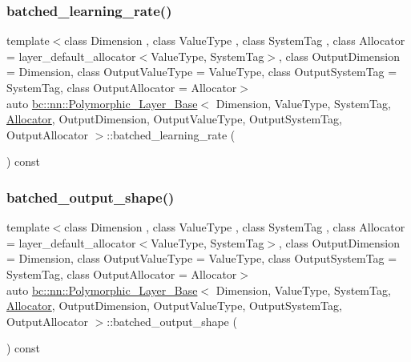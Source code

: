 \subsubsection{\texorpdfstring{batched\+\_\+learning\+\_\+rate()}{batched\_learning\_rate()}\hspace{0.1cm}{\footnotesize\ttfamily [2/2]}}
{\footnotesize\ttfamily template$<$class Dimension , class Value\+Type , class System\+Tag , class Allocator  = layer\+\_\+default\+\_\+allocator$<$\+Value\+Type, System\+Tag$>$, class Output\+Dimension  = Dimension, class Output\+Value\+Type  = Value\+Type, class Output\+System\+Tag  = System\+Tag, class Output\+Allocator  = Allocator$>$ \\
auto \hyperlink{structbc_1_1nn_1_1Polymorphic__Layer__Base}{bc\+::nn\+::\+Polymorphic\+\_\+\+Layer\+\_\+\+Base}$<$ Dimension, Value\+Type, System\+Tag, \hyperlink{classbc_1_1allocators_1_1Allocator}{Allocator}, Output\+Dimension, Output\+Value\+Type, Output\+System\+Tag, Output\+Allocator $>$\+::batched\+\_\+learning\+\_\+rate (\begin{DoxyParamCaption}{ }\end{DoxyParamCaption}) const\hspace{0.3cm}{\ttfamily [inline]}}

\mbox{\label{structbc_1_1nn_1_1Polymorphic__Layer__Base_a93154c06cdfce8282d48a114055d3e2a}} 
\subsubsection{\texorpdfstring{batched\+\_\+output\+\_\+shape()}{batched\_output\_shape()}\hspace{0.1cm}{\footnotesize\ttfamily [1/2]}}
{\footnotesize\ttfamily template$<$class Dimension , class Value\+Type , class System\+Tag , class Allocator  = layer\+\_\+default\+\_\+allocator$<$\+Value\+Type, System\+Tag$>$, class Output\+Dimension  = Dimension, class Output\+Value\+Type  = Value\+Type, class Output\+System\+Tag  = System\+Tag, class Output\+Allocator  = Allocator$>$ \\
auto \hyperlink{structbc_1_1nn_1_1Polymorphic__Layer__Base}{bc\+::nn\+::\+Polymorphic\+\_\+\+Layer\+\_\+\+Base}$<$ Dimension, Value\+Type, System\+Tag, \hyperlink{classbc_1_1allocators_1_1Allocator}{Allocator}, Output\+Dimension, Output\+Value\+Type, Output\+System\+Tag, Output\+Allocator $>$\+::batched\+\_\+output\+\_\+shape (\begin{DoxyParamCaption}{ }\end{DoxyParamCaption}) const\hspace{0.3cm}{\ttfamily [inline]}}

